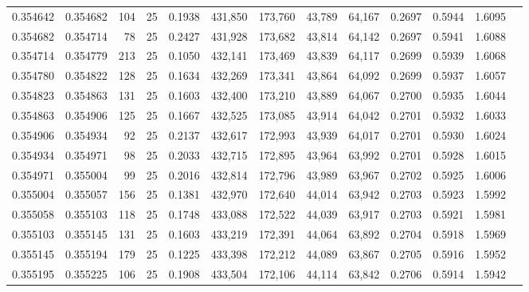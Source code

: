 \begin{tabular}{rrrrrrrrrrrrr}
0.354642 & 0.354682 &   104 &  25 &                                     0.1938 & 431,850 & 173,760 &  43,789 &  64,167 & 0.2697 & 0.5944 & 1.6095 \\
0.354682 & 0.354714 &    78 &  25 &                                     0.2427 & 431,928 & 173,682 &  43,814 &  64,142 & 0.2697 & 0.5941 & 1.6088 \\
0.354714 & 0.354779 &   213 &  25 &                                     0.1050 & 432,141 & 173,469 &  43,839 &  64,117 & 0.2699 & 0.5939 & 1.6068 \\
0.354780 & 0.354822 &   128 &  25 &                                     0.1634 & 432,269 & 173,341 &  43,864 &  64,092 & 0.2699 & 0.5937 & 1.6057 \\
0.354823 & 0.354863 &   131 &  25 &                                     0.1603 & 432,400 & 173,210 &  43,889 &  64,067 & 0.2700 & 0.5935 & 1.6044 \\
0.354863 & 0.354906 &   125 &  25 &                                     0.1667 & 432,525 & 173,085 &  43,914 &  64,042 & 0.2701 & 0.5932 & 1.6033 \\
0.354906 & 0.354934 &    92 &  25 &                                     0.2137 & 432,617 & 172,993 &  43,939 &  64,017 & 0.2701 & 0.5930 & 1.6024 \\
0.354934 & 0.354971 &    98 &  25 &                                     0.2033 & 432,715 & 172,895 &  43,964 &  63,992 & 0.2701 & 0.5928 & 1.6015 \\
0.354971 & 0.355004 &    99 &  25 &                                     0.2016 & 432,814 & 172,796 &  43,989 &  63,967 & 0.2702 & 0.5925 & 1.6006 \\
0.355004 & 0.355057 &   156 &  25 &                                     0.1381 & 432,970 & 172,640 &  44,014 &  63,942 & 0.2703 & 0.5923 & 1.5992 \\
0.355058 & 0.355103 &   118 &  25 &                                     0.1748 & 433,088 & 172,522 &  44,039 &  63,917 & 0.2703 & 0.5921 & 1.5981 \\
0.355103 & 0.355145 &   131 &  25 &                                     0.1603 & 433,219 & 172,391 &  44,064 &  63,892 & 0.2704 & 0.5918 & 1.5969 \\
0.355145 & 0.355194 &   179 &  25 &                                     0.1225 & 433,398 & 172,212 &  44,089 &  63,867 & 0.2705 & 0.5916 & 1.5952 \\
0.355195 & 0.355225 &   106 &  25 &                                     0.1908 & 433,504 & 172,106 &  44,114 &  63,842 & 0.2706 & 0.5914 & 1.5942 \\

\end{tabular}
